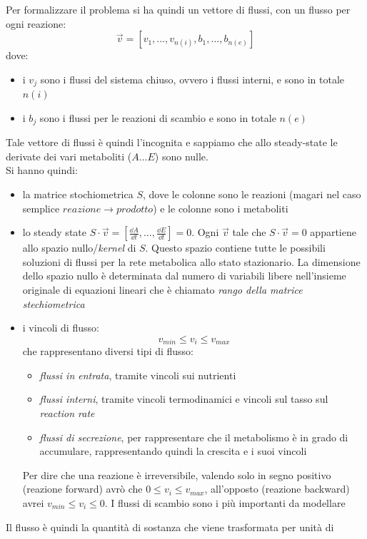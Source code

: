 \documentclass[a4paper,12pt, oneside]{book}
\begin{document}
Per formalizzare il problema si ha quindi un vettore di flussi, con un flusso
per ogni reazione:
\[\vec{v}=[v_1,\ldots, v_{n(i)}, b_1,\ldots,b_{n(e)}]\]
dove:
\begin{itemize}
  \item i $v_j$ sono i flussi del sistema chiuso, ovvero i flussi interni, e
  sono in totale $n(i)$ 
  \item i $b_j$ sono i flussi per le reazioni di scambio e sono in totale $n(e)$
\end{itemize}
Tale vettore di flussi è quindi l'incognita e sappiamo che allo steady-state le
derivate dei vari metaboliti ($A\ldots E$) sono nulle.\\
Si hanno quindi:
\begin{itemize}
  \item la matrice stochiometrica $S$, dove le colonne sono le reazioni (magari
  nel caso semplice $reazione\to prodotto$) e le colonne sono i metaboliti
  \item lo steady state $S\cdot \vec{v} = [\frac{\dd{A}}{\dd{t}},\ldots,
  \frac{\dd{E}}{\dd{t}}]= 0$. Ogni $\vec{v}$ tale che $S\cdot\vec{v}=0$
  appartiene allo spazio nullo/\textit{kernel} di $S$. Questo spazio
  contiene tutte le possibili soluzioni di flussi per la rete metabolica allo
  stato stazionario. La dimensione dello spazio nullo è determinata dal numero
  di variabili libere nell'insieme originale di equazioni lineari che è chiamato
  \textit{rango della matrice stechiometrica} 
  \item i vincoli di flusso:
  \[v_{min}\leq v_i\leq v_{max}\]
  che rappresentano diversi tipi di flusso:
  \begin{itemize}
    \item \textit{flussi in entrata}, tramite vincoli sui nutrienti
    \item \textit{flussi interni}, tramite vincoli termodinamici e vincoli sul
    tasso sul \textit{reaction rate}
    \item \textit{flussi di secrezione}, per rappresentare che il metabolismo è
    in grado di accumulare, rappresentando quindi la crescita e i suoi vincoli
  \end{itemize}
  Per dire che una reazione è irreversibile, valendo solo in segno positivo
  (reazione forward) avrò
  che $0\leq v_i\leq v_{max}$, all'opposto (reazione backward) avrei
  $v_{min}\leq v_i\leq 0$. I flussi di scambio sono i più importanti da
modellare 
\end{itemize}
Il flusso è quindi la quantità di sostanza che viene trasformata per unità di
\end{document}
